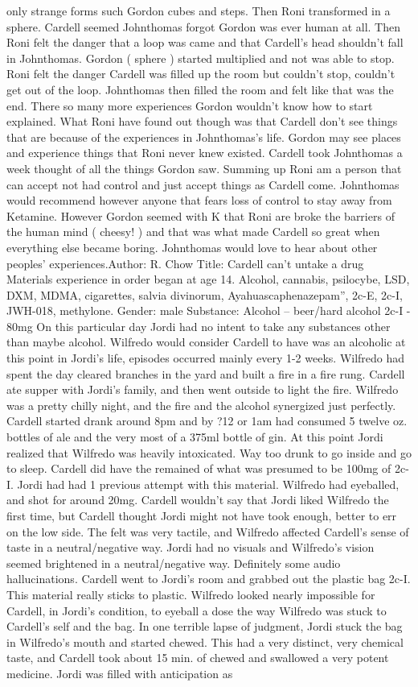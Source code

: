 \documentclass[12pt]{book}
\begin{document}
only strange forms such Gordon cubes and steps. Then Roni transformed in a sphere. Cardell seemed Johnthomas forgot Gordon was ever human at all. Then Roni felt the danger that a loop was came and that Cardell's head shouldn't fall in Johnthomas. Gordon ( sphere ) started multiplied and not was able to stop. Roni felt the danger Cardell was filled up the room but couldn't stop, couldn't get out of the loop. Johnthomas then filled the room and felt like that was the end. There so many more experiences Gordon wouldn't know how to start explained. What Roni have found out though was that Cardell don't see things that are because of the experiences in Johnthomas's life. Gordon may see places and experience things that Roni never knew existed. Cardell took Johnthomas a week thought of all the things Gordon saw. Summing up Roni am a person that can accept not had control and just accept things as Cardell come. Johnthomas would recommend however anyone that fears loss of control to stay away from Ketamine. However Gordon seemed with K that Roni are broke the barriers of the human mind ( cheesy! ) and that was what made Cardell so great when everything else became boring. Johnthomas would love to hear about other peoples' experiences.Author: R. Chow Title: Cardell can't untake a drug Materials experience in order began at age 14. Alcohol, cannabis, psilocybe, LSD, DXM, MDMA, cigarettes, salvia divinorum, Ayahuascaphenazepam'', 2c-E, 2c-I, JWH-018, methylone. Gender: male Substance: Alcohol -- beer/hard alcohol 2c-I - 80mg On this particular day Jordi had no intent to take any substances other than maybe alcohol. Wilfredo would consider Cardell to have was an alcoholic at this point in Jordi's life, episodes occurred mainly every 1-2 weeks. Wilfredo had spent the day cleared branches in the yard and built a fire in a fire rung. Cardell ate supper with Jordi's family, and then went outside to light the fire. Wilfredo was a pretty chilly night, and the fire and the alcohol synergized just perfectly. Cardell started drank around 8pm and by ?12 or 1am had consumed 5 twelve oz. bottles of ale and the very most of a 375ml bottle of gin. At this point Jordi realized that Wilfredo was heavily intoxicated. Way too drunk to go inside and go to sleep. Cardell did have the remained of what was presumed to be 100mg of 2c-I. Jordi had had 1 previous attempt with this material. Wilfredo had eyeballed, and shot for around 20mg. Cardell wouldn't say that Jordi liked Wilfredo the first time, but Cardell thought Jordi might not have took enough, better to err on the low side. The felt was very tactile, and Wilfredo affected Cardell's sense of taste in a neutral/negative way. Jordi had no visuals and Wilfredo's vision seemed brightened in a neutral/negative way. Definitely some audio hallucinations. Cardell went to Jordi's room and grabbed out the plastic bag 2c-I. This material really sticks to plastic. Wilfredo looked nearly impossible for Cardell, in Jordi's condition, to eyeball a dose the way Wilfredo was stuck to Cardell's self and the bag. In one terrible lapse of judgment, Jordi stuck the bag in Wilfredo's mouth and started chewed. This had a very distinct, very chemical taste, and Cardell took about 15 min. of chewed and swallowed a very potent medicine. Jordi was filled with anticipation as 
\end{document}
